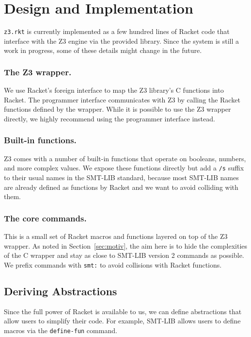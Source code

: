 \section{Design and Implementation}
\label{sec:design-impl}

\texttt{z3.rkt} is currently implemented as a few hundred lines of Racket code
that interface with the Z3 engine via the provided library. Since the system is
still a work in progress, some of these details might change in the future.

\subsubsection{The Z3 wrapper.} We use Racket's foreign interface \cite{racket/foreign}
to map the Z3 library's C functions into Racket. The programmer interface
communicates with Z3 by calling the Racket functions defined by the
wrapper. While it is possible to use the Z3 wrapper directly, we highly
recommend using the programmer interface instead.

\subsubsection{Built-in functions.} Z3 comes with a number of built-in functions that
operate on booleans, numbers, and more complex values. We expose these
functions directly but add a \texttt{/s} suffix to their usual names in the
SMT-LIB standard, because most SMT-LIB names are already defined as functions
by Racket and we want to avoid colliding with them.

\subsubsection{The core commands.} This is a small set of Racket macros and functions
layered on top of the Z3 wrapper. As noted in Section~\ref{sec:motiv}, the aim
here is to hide the complexities of the C wrapper and stay as close to SMT-LIB
version 2 commands \cite{smtlib2:10} as possible. We prefix commands with
\texttt{smt:} to avoid collisions with Racket functions.

\subsection{Deriving Abstractions}
\label{sec:derived}

Since the full power of Racket is available to us, we can define abstractions
that allow users to simplify their code. For example, SMT-LIB allows users to
define macros via the \texttt {define-fun} command.


